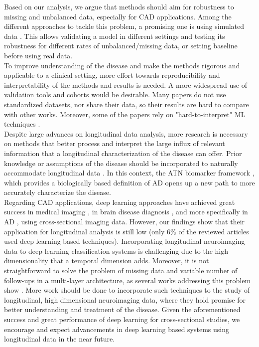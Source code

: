 Based on our analysis, we argue that methods should aim for robustness to missing and unbalanced data, especially for CAD applications. Among the different approaches to tackle this problem, a promising one is using simulated data \cite{Chen2011b,Chen2012,Eshaghi2017,Hyun2016,Li2017b,Li2013,Zhang2014,Ziegler2015b}. This allows validating a model in different settings and testing its robustness for different rates of unbalanced/missing data, or setting baseline before using real data. \\

To improve understanding of the disease and make the methods rigorous and applicable to a clinical setting, more effort towards reproducibility and interpretability of the methods and results is needed. A more widespread use of validation tools and cohorts would be desirable. Many papers do not use standardized datasets, nor share their data, so their results are hard to compare with other works. Moreover, some of the papers rely on "hard-to-interpret" ML techniques \cite{Givon2017,Zhang2017}. \\

Despite large advances on longitudinal data analysis, more research is necessary on methods that better process and interpret the large influx of relevant information that a longitudinal characterization of the disease can offer. Prior knowledge or assumptions of the disease should be incorporated to naturally accommodate longitudinal data \cite{Fonteijn2012,Gavidia-Bovadilla2017,Zhu2016a}. In this context, the ATN biomarker framework \cite{Jack2018}, which provides a biologically based definition of AD opens up a new path to more accurately characterize the disease. \\

Regarding CAD applications, deep learning approaches have achieved great success in medical imaging \cite{Litjens2017}, in brain disease diagnosis \cite{Talo2019,Talo2019b}, and more specifically in AD \cite{Liu2014,Jo2019}, using cross-sectional imaging data. However, our findings show that their application for longitudinal analysis is still low (only $6\%$ of the reviewed articles used deep learning based techniques). Incorporating longitudinal neuroimaging data to deep learning classification systems is challenging due to the high dimensionality that a temporal dimension adds. Moreover, it is not straightforward to solve the problem of missing data and variable number of follow-ups in a multi-layer architecture, as several works addressing this problem show \cite{Givon2017,Ghazi2019}. More work should be done to incorporate such techniques to the study of longitudinal, high dimensional neuroimaging data, where they hold promise for better understanding and treatment of the disease. Given the aforementioned success and great performance of deep learning for cross-sectional studies, we encourage and expect advancements in deep learning based systems using longitudinal data in the near future.\\

